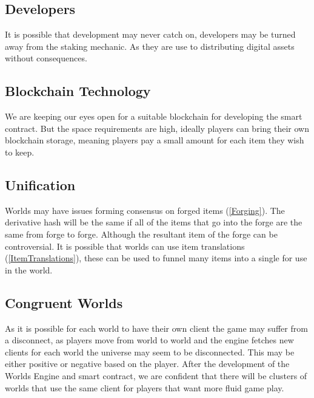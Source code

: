 \documentclass[runningheads,a4paper]{llncs}
\begin{document}
\subsection{Developers}
It is possible that development may never catch on, developers may be turned away from the staking mechanic. As they are use to distributing digital assets without consequences. 

\subsection{Blockchain Technology}
We are keeping our eyes open for a suitable blockchain for developing the smart contract. But the space requirements are high, ideally players can bring their own blockchain storage, meaning players pay a small amount for each item they wish to keep. 

\subsection{Unification}
Worlds may have issues forming consensus on forged items (\ref{Forging}). The derivative hash will be the same if all of the items that go into the forge are the same from forge to forge. Although the resultant item of the forge can be controversial. It is possible that worlds can use item translations (\ref{ItemTranslations}), these can be used to funnel many items into a single for use in the world.

\subsection{Congruent Worlds}
As it is possible for each world to have their own client the game may suffer from a disconnect, as players move from world to world and the engine fetches new clients for each world the universe may seem to be disconnected. This may be either positive or negative based on the player. After the development of the Worlds Engine and smart contract, we are confident that there will be clusters of worlds that use the same client for players that want more fluid game play.
\end{document}
